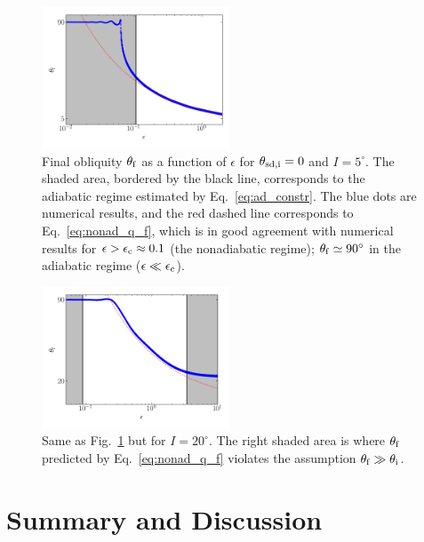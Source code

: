 \documentclass[
        fleqn,
        usenatbib,
    ]{mnras}
\begin{document}
\begin{figure}
    \centering
    \includegraphics[width=0.5\textwidth]{plots_diskdisp/3scan.png}
    \caption{Final obliquity $\theta_{\rm  f}$ as a function of $\epsilon$ for
    $\theta_{\rm sd,i} = 0$ and $I = 5^\circ$. The shaded area, bordered by the
    black line, corresponds to the adiabatic regime estimated by
    Eq.~\eqref{eq:ad_constr}. The blue dots are numerical results, and the red
    dashed line corresponds to Eq.~\eqref{eq:nonad_q_f}, which is in good
    agreement with numerical results for $\epsilon > \epsilon_{\rm c} \approx
    0.1$ (the nonadiabatic regime); $\theta_{\rm f} \simeq  90^\circ$ in the
    adiabatic regime ($\epsilon\ll \epsilon_{\rm c}$).}\label{fig:nonad_3_scan}
\end{figure}
\begin{figure}
    \centering
    \includegraphics[width=0.5\textwidth]{plots_diskdisp/3scan_20.png}
    \caption{Same as Fig.~\ref{fig:nonad_3_scan} but for $I=20^\circ$. The right
    shaded area is where $\theta_{\rm f}$ predicted by Eq.~\eqref{eq:nonad_q_f}
    violates the assumption $\theta_{\rm f} \gg \theta_{\rm
    i}$.}\label{fig:nonad_3_scan_20}
\end{figure}

\section{Summary and Discussion}\label{s:disc}

\end{document}
